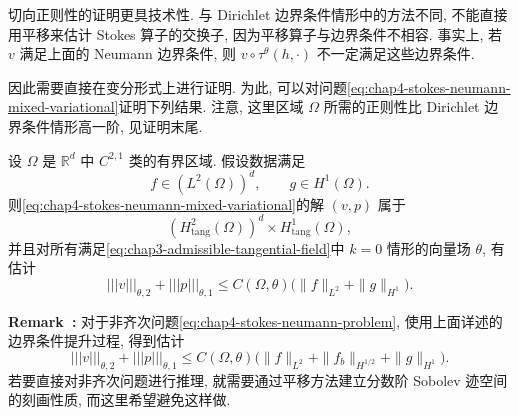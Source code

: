 切向正则性的证明更具技术性. 与 Dirichlet 边界条件情形中的方法不同, 不能直接用平移来估计 Stokes 算子的交换子, 因为平移算子与边界条件不相容. 事实上, 若 $v$ 满足上面的 Neumann 边界条件, 则 $v\circ\tau^\theta(h,\cdot)$ 不一定满足这些边界条件.

因此需要直接在变分形式上进行证明. 为此, 可以对问题\eqref{eq:chap4-stokes-neumann-mixed-variational}证明下列结果. 注意, 这里区域 $\Omega$ 所需的正则性比 Dirichlet 边界条件情形高一阶, 见证明末尾.

\begin{Theorem}
\label{thm:chap4-stokes-neumann-tangential-regularity}
设 $\Omega$ 是 $\mathbb R^d$ 中 $C^{2,1}$ 类的有界区域. 假设数据满足
\[
 f\in(L^2(\Omega))^d,\qquad g\in H^1(\Omega).
\]
则\eqref{eq:chap4-stokes-neumann-mixed-variational}的解 $(v,p)$ 属于
\[
 (H_{\mathrm{tang}}^2(\Omega))^d\times H_{\mathrm{tang}}^1(\Omega),
\]
并且对所有满足\eqref{eq:chap3-admissible-tangential-field}中 $k=0$ 情形的向量场 $\theta$, 有估计
\[
 |||v|||_{\theta,2}+|||p|||_{\theta,1}
 \leq C(\Omega,\theta)\bigl(\|f\|_{L^2}+\|g\|_{H^1}\bigr).
\]
\end{Theorem}

\par\noindent{}\textbf{Remark~\thechapterfoursectionsevenremark:}\label{rem:chap4-stokes-neumann-nonhomogeneous-tangential}\quad
对于非齐次问题\eqref{eq:chap4-stokes-neumann-problem}, 使用上面详述的边界条件提升过程, 得到估计
\[
 |||v|||_{\theta,2}+|||p|||_{\theta,1}
 \leq C(\Omega,\theta)\bigl(\|f\|_{L^2}+\|f_b\|_{H^{1/2}}+\|g\|_{H^1}\bigr).
\]
若要直接对非齐次问题进行推理, 就需要通过平移方法建立分数阶 Sobolev 迹空间的刻画性质, 而这里希望避免这样做.

